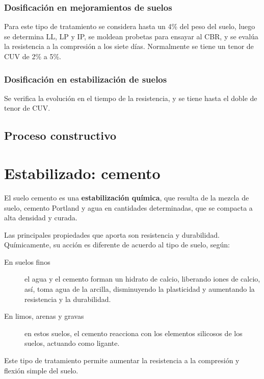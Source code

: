 \documentclass[../main.tex]{subfiles}
\begin{document}
\subsubsection{Dosificación en mejoramientos de suelos}

Para este tipo de tratamiento se considera hasta un 4\% del peso del suelo,
luego se determina LL, LP y IP, se moldean probetas para ensayar al CBR, y 
se evalúa la resistencia a la compresión a los siete días. Normalmente se tiene
un tenor de CUV de 2\% a 5\%.

\subsubsection{Dosificación en estabilización de suelos}

Se verifica la evolución en el tiempo de la resistencia, y se tiene hasta el
doble de tenor de CUV.

\subsection{Proceso constructivo}


\section{Estabilizado: cemento}

El suelo cemento es una \textbf{estabilización química}, que resulta de la mezcla
de suelo, cemento Portland y agua en cantidades determinadas, que se compacta
a alta densidad y curada.

Las principales propiedades que aporta son resistencia y durabilidad. 
Químicamente, su acción es diferente de acuerdo al tipo de suelo, según:

\begin{description}
  \item[En suelos finos] el agua y el cemento forman un hidrato de calcio,
    liberando iones de calcio, así, toma agua de la arcilla, disminuyendo la
    plasticidad y aumentando la resistencia y la durabilidad.
  \item[En limos, arenas y gravas] en estos suelos, el cemento reacciona con los
    elementos silicosos de los suelos, actuando como ligante.
\end{description}

Este tipo de tratamiento permite aumentar la resistencia a la compresión 
y flexión simple del suelo.
\end{document}
